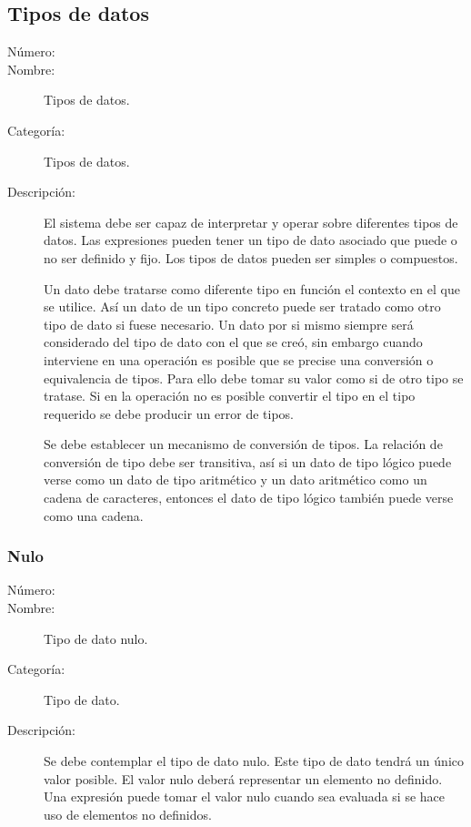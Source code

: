 \subsection{Tipos de datos}

\begin{framed}
	\begin{description}
		\item [Número:] \cn
		\item [Nombre:] Tipos de datos.
		\item [Categoría:] Tipos de datos.
		\item [Descripción:] El sistema debe ser capaz de interpretar y operar sobre diferentes tipos de datos. Las expresiones
		pueden tener un tipo de dato asociado que puede o no ser definido y fijo. Los tipos de datos pueden ser simples o compuestos.
		
		Un dato debe tratarse como diferente tipo en función el contexto en el que se utilice. Así un dato de un tipo concreto puede ser tratado como
		otro tipo de dato si fuese necesario. Un dato por si mismo siempre será considerado del tipo de dato con el que se creó, sin embargo
		cuando interviene en una operación es posible que se precise una conversión o equivalencia de tipos. Para ello debe tomar su valor como si de otro
		tipo se tratase. Si en la operación no es posible convertir el tipo en el tipo requerido se debe producir un error de tipos.
      
		Se debe establecer un mecanismo de conversión de tipos. La relación de conversión de tipo debe ser transitiva, así
		si un dato de tipo lógico puede verse como un dato de tipo aritmético y un dato aritmético como un cadena de caracteres, entonces el
		dato de tipo lógico también puede verse como una cadena.
   \end {description}
\end{framed}

\subsubsection{Nulo}
\begin{framed}
	\begin{description}
		\item [Número:] \cn
		\item [Nombre:] Tipo de dato nulo.
		\item [Categoría:] Tipo de dato.
		\item [Descripción:] Se debe contemplar el tipo de dato nulo. Este tipo de dato tendrá un único valor 
      posible. El valor nulo deberá representar un elemento no definido. Una expresión puede tomar el
      valor nulo cuando sea evaluada si se hace uso de elementos no definidos.
	\end {description}
\end{framed}

